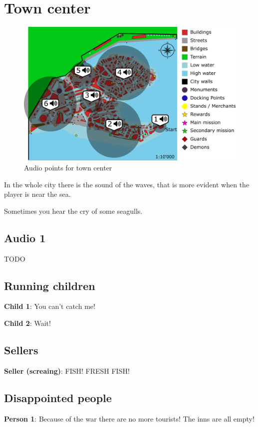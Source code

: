 \section{Town center}
\begin{figure}[H]
  \centering
  \includegraphics[width=\textwidth]{Images/Maps/dynamiaAudio}
  \caption{Audio points for town center}
\end{figure}

In the whole city there is the sound of the waves, that is more evident when the player is near the sea.

Sometimes you hear the cry of some seagulls.

\subsection{Audio 1}
TODO

\subsection{Running children}
\textbf{Child 1}: You can't catch me!

\textbf{Child 2}: Wait!

\subsection{Sellers}
\textbf{Seller (screaing)}: FISH! FRESH FISH!

\subsection{Disappointed people}
\textbf{Person 1}: Because of the war there are no more tourists! The inns are all empty!

